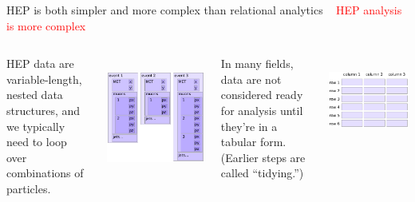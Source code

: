 \documentclass[aspectratio=169]{beamer}
\begin{document}
\begin{frame}{HEP is both simpler and more complex than relational analytics}
\vspace{0.35 cm}
\mbox{ } \hfill \textcolor{red}{\LARGE HEP analysis is more complex} \hfill \mbox{ }

\vspace{-0.25 cm}
\begin{columns}[t]

HEP data are variable-length, nested data structures, and we typically need to loop over combinations of particles.

\vspace{0.25 cm}
\mbox{ } \hfill \includegraphics[width=0.8\linewidth]{event-structure.pdf} \hfill \hfill \mbox{ }


In many fields, data are not considered ready for analysis until they're in a tabular form. (Earlier steps are called ``tidying.'')

\vspace{0.25 cm}
\mbox{ } \hfill \includegraphics[width=0.8\linewidth]{table-structure.pdf} \hfill \hfill \mbox{ }

\end{columns}
\end{frame}
\end{document}
